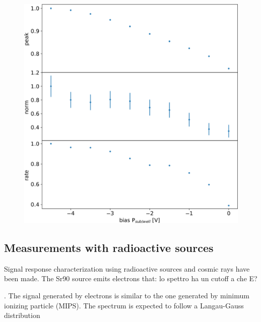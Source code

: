         \begin{figure}[h!]
            \centering
            \includegraphics[width=.70\linewidth]{figures/charaterization/Fe_param_vs_bias.pdf}
            \caption{}
            \label{fig:Fe_param_vs_bias}
        \end{figure}     


    \subsection{Measurements with radioactive sources}
        Signal response characterization using radioactive sources and cosmic rays have been made. 
        The Sr90 source emits electrons that: lo spettro ha un cutoff a che E?  

        .
        The signal generated by electrons is similar to the one generated by minimum ionizing particle (MIPS).
        The spectrum is expected to follow a Langau-Gauss distribution

